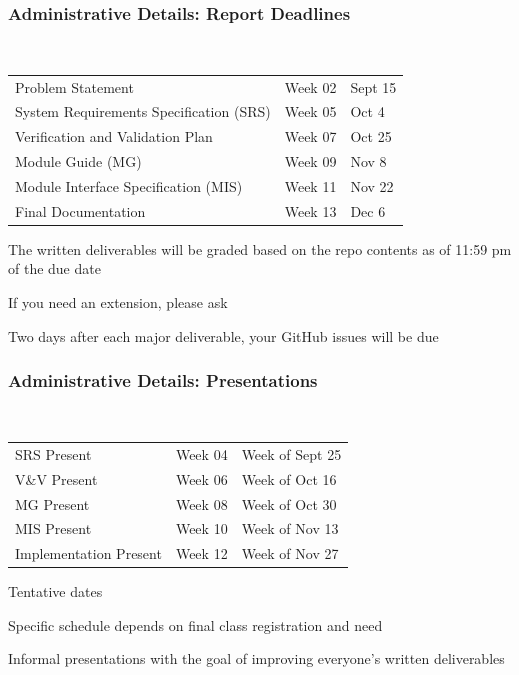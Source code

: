\documentclass[t,12pt,numbers,fleqn]{beamer}
\begin{document}

\begin{frame}
\frametitle{Administrative Details: Report Deadlines}
~\newline
\begin{tabular}{l l l}
Problem Statement & Week 02 & Sept 15\\
System Requirements Specification (SRS) & Week 05 & Oct 4\\
Verification and Validation Plan & Week 07 & Oct 25\\
Module Guide (MG) & Week 09 & Nov 8\\
Module Interface Specification (MIS) & Week 11 & Nov 22\\
Final Documentation & Week 13 & Dec 6\\
\end {tabular}

\bi
\item The written deliverables will be graded based on the repo contents as of
11:59 pm of the due date
\item If you need an extension, please ask
\item Two days after each major deliverable, your GitHub issues will be due
\ei

\end{frame}


\begin{frame}
\frametitle{Administrative Details: Presentations}

~\newline
\begin{tabular}{l l l}
SRS Present & Week 04 & Week of Sept 25\\
V\&V Present & Week 06 & Week of Oct 16\\
MG Present & Week 08 & Week of Oct 30\\
MIS Present & Week 10 & Week of Nov 13\\
Implementation Present & Week 12 & Week of Nov 27\\
\end {tabular}

\bi
\item Tentative dates
\item Specific schedule depends on final class registration and need
\item Informal presentations with the goal of improving everyone's written
  deliverables
\ei

\end{frame}
\end{document}
